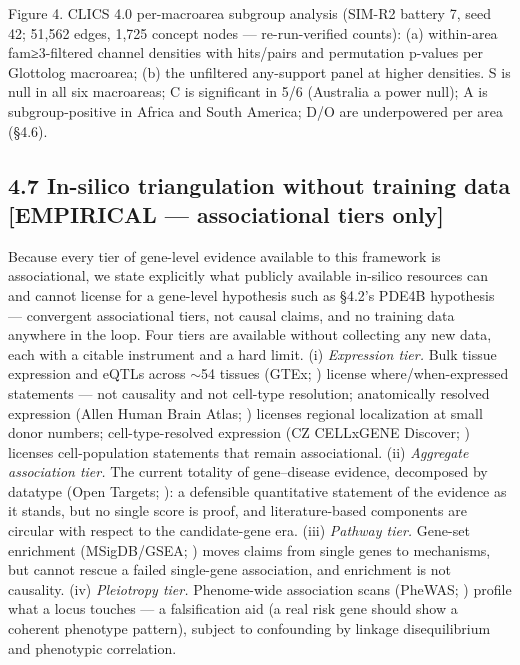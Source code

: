 \documentclass[
]{article}
\begin{document}
Figure 4. CLICS 4.0 per-macroarea subgroup analysis (SIM-R2 battery 7,
seed 42; 51,562 edges, 1,725 concept nodes --- re-run-verified counts):
(a) within-area fam{≥}3-filtered channel densities with hits/pairs and
permutation p-values per Glottolog macroarea; (b) the unfiltered
any-support panel at higher densities. S is null in all six macroareas;
C is significant in 5/6 (Australia a power null); A is subgroup-positive
in Africa and South America; D/O are underpowered per area (§4.6).

\subsection{4.7 In-silico triangulation without training data
{[}EMPIRICAL --- associational tiers
only{]}}\label{in-silico-triangulation-without-training-data-empirical-associational-tiers-only}

Because every tier of gene-level evidence available to this framework is
associational, we state explicitly what publicly available in-silico
resources can and cannot license for a gene-level hypothesis such as
§4.2's PDE4B hypothesis --- convergent associational tiers, not causal
claims, and no training data anywhere in the loop. Four tiers are
available without collecting any new data, each with a citable
instrument and a hard limit. (i) \emph{Expression tier.} Bulk tissue
expression and eQTLs across \(\sim\)54 tissues (GTEx; ) license
where/when-expressed statements --- not causality and not cell-type
resolution; anatomically resolved expression (Allen Human Brain Atlas; )
licenses regional localization at small donor numbers;
cell-type-resolved expression (CZ CELLxGENE Discover; ) licenses
cell-population statements that remain associational. (ii)
\emph{Aggregate association tier.} The current totality of gene--disease
evidence, decomposed by datatype (Open Targets; ): a defensible
quantitative statement of the evidence as it stands, but no single score
is proof, and literature-based components are circular with respect to
the candidate-gene era. (iii) \emph{Pathway tier.} Gene-set enrichment
(MSigDB/GSEA; ) moves claims from single genes to mechanisms, but cannot
rescue a failed single-gene association, and enrichment is not
causality. (iv) \emph{Pleiotropy tier.} Phenome-wide association scans
(PheWAS; ) profile what a locus touches --- a falsification aid (a real
risk gene should show a coherent phenotype pattern), subject to
confounding by linkage disequilibrium and phenotypic correlation.
\end{document}

